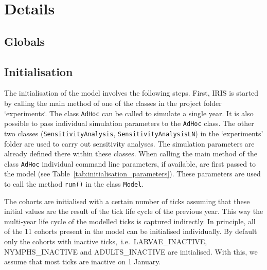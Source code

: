 \documentclass[a4paper, 11pt]{scrartcl}
\newcommand{\inlinecode}[1]{\texttt{\small #1}}
\begin{document}
\newpage
\section{Details}

\subsection{Globals}

\subsection{Initialisation}\label{initialisation}
The initialisation of the model involves the following steps. First, IRIS is started by calling the main method of one of the classes in the project folder `experiments`. The class \inlinecode{AdHoc} can be called to simulate a single year. It is also possible to pass individual simulation parameters to the \inlinecode{AdHoc} class. The other two classes (\inlinecode{SensitivityAnalysis}, \inlinecode{SensitivityAnalysisLN}) in the `experiments' folder are used to carry out sensitivity analyses. The simulation parameters are already defined there within these classes. When calling the main method of the class \inlinecode{AdHoc} individual command line parameters, if available, are first passed to the model (see Table~\ref{tab:initialisation_parameters}). These parameters are used to call the method \inlinecode{run()} in the class \inlinecode{Model}. 

The cohorts are initialised with a certain number of ticks assuming that these initial values are the result of the tick life cycle of the previous year. This way the multi-year life cycle of the modelled ticks is captured indirectly. In principle, all of the 11 cohorts present in the model can be initialised individually. By default only the cohorts with inactive ticks,~i.e.\ LARVAE\_INACTIVE, NYMPHS\_INACTIVE and ADULTS\_INACTIVE are initialised. With this, we assume that most ticks are inactive on 1 January.
\end{document}
